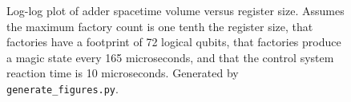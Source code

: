 \documentclass[onecolumn,unpublished]{quantumarticle}
\theoremstyle{definition}
\theoremstyle{definition}
\theoremstyle{definition}
\begin{document}
\begin{figure}
    \centering
    \endminipage
    \endminipage
    \caption{
        Log-log plot of adder spacetime volume versus register size. Assumes the maximum factory count is one tenth the register size, that factories have a footprint of 72 logical qubits, that factories produce a magic state every 165 microseconds, and that the control system reaction time is 10 microseconds.
        Generated by \texttt{generate\_figures.py}.
    }
    \label{fig:size_versus_volume}
\end{figure}
\end{document}
